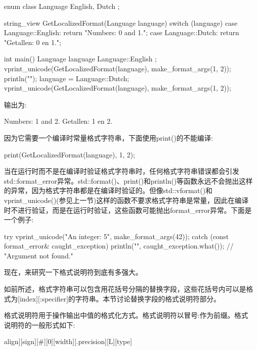 \begin{cpp}
enum class Language { English, Dutch };

string_view GetLocalizedFormat(Language language)
{
    switch (language) {
        case Language::English: return "Numbers: {0} and {1}.";
        case Language::Dutch: return "Getallen: {0} en {1}.";
    }
}

int main()
{
    Language language { Language::English };
    vprint_unicode(GetLocalizedFormat(language), make_format_args(1, 2));
    println("");
    language = Language::Dutch;
    vprint_unicode(GetLocalizedFormat(language), make_format_args(1, 2));
}
\end{cpp}

输出为:

\begin{shell}
Numbers: 1 and 2.
Getallen: 1 en 2.
\end{shell}

因为它需要一个编译时常量格式字符串，下面使用print()的不能编译:

\begin{cpp}
print(GetLocalizedFormat(language), 1, 2);
\end{cpp}


当在运行时而不是在编译时验证格式字符串时，任何格式字符串错误都会引发std::format\_error异常。std::format()、print()和println()等函数永远不会抛出这样的异常，因为格式字符串都是在编译时验证的。但像std::vformat()和vprint\_unicode()(参见上一节)这样的函数不要求格式字符串是常量，因此在编译时不进行验证，而是在运行时验证，这些函数可能抛出format\_error异常。下面是一个例子:

\begin{cpp}
try {
    vprint_unicode("An integer: {5}", make_format_args(42));
} catch (const format_error& caught_exception) {
    println("{}", caught_exception.what()); // "Argument not found."
}
\end{cpp}

现在，来研究一下格式说明符到底有多强大。


如前所述，格式字符串可以包含用花括号分隔的替换字段，这些花括号内可以是格式为[index][:specifier]的字符串。本节讨论替换字段的格式说明符部分。

格式说明符用于操作输出中值的格式化方式。格式说明符以冒号:作为前缀。格式说明符的一般形式如下:

\begin{shell}
[[fill]align][sign][#][0][width][.precision][L][type]
\end{shell}

